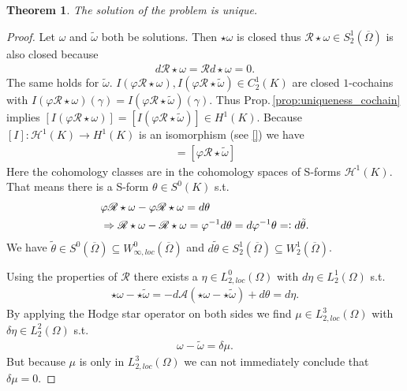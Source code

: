 \documentclass[12pt,a4paper]{article}
\numberwithin{equation}{subsection}
\numberwithin{lemma}{subsection}
\newtheorem{theorem}[lemma]{Theorem}
\theoremstyle{definition}
\newcommand{\aop}{\mathscr{A}}
\newcommand{\omegabar}{\overline{\Omega}}
\newcommand{\rop}{\mathscr{R}} %
\begin{document}
\begin{theorem}
    The solution of the problem is unique.
\end{theorem}
\begin{proof}
    Let $\omega$ and $\tilde{\omega}$ both be solutions. Then $\star\omega$ is 
    closed thus $\rop \star\omega \in S_2^1(\omegabar)$ is also closed because 
    \begin{align*}
        d \rop \star \omega = \rop d\star\omega = 0.
    \end{align*}
    The same 
    holds for $\tilde{\omega}$. 
    $I(\varphi \rop \star \omega)
    , I(\varphi \rop \star \tilde{\omega}) \in C^1_2(K)$ 
    are closed $1$-cochains with
    $I(\varphi\rop \star \omega)(\gamma) 
    = I(\varphi\rop \star \tilde{\omega})(\gamma)$. 
    Thus Prop.\,\ref{prop:uniqueness_cochain} implies 
    $[I(\varphi\rop \star \omega)] 
    = [I(\varphi\rop \star \tilde{\omega})] \in H^1(K)$.
    Because $[I]: \mathscr{H}^1(K) \rightarrow H^1(K)$ is an isomorphism
    (see \ref{}) we have 
    \begin{align*}
        [\varphi\rop \star \omega] = [\varphi\rop \star \tilde{\omega}] 
    \end{align*}
    Here the cohomology classes are in the cohomology spaces of S-forms 
    $\mathscr{H}^1(K)$. That means there is a S-form $\theta \in S^0(K)$ s.t.
    \begin{align*}
        &\varphi \rop \star\omega - \varphi \rop \star\omega = d\theta \\ 
        &\Rightarrow \rop \star\omega -  \rop \star\omega = \varphi^{-1} d\theta 
        = d\varphi^{-1}\theta =\vcentcolon d\tilde{\theta}.
    \end{align*}
    We have $\tilde{\theta} \in S^0(\omegabar) \subseteq 
    W_{\infty,loc}^0(\omegabar)$ and $d \tilde{\theta} \in S_2^1(\omegabar)
    \subseteq W_2^1(\omegabar)$.

    Using the 
    properties of $\rop$ there exists a $\eta \in L_{2,loc}^0(\Omega)$
    with $d\eta \in L^1_2(\Omega)$ s.t. 
    \begin{align*}
        \star\omega - \star\tilde{\omega} 
        = -d\aop(\star\omega - \star\tilde{\omega})
        + d \theta = d\eta.
    \end{align*}
    By applying the Hodge star operator on both sides we find 
    $\mu \in L_{2,loc}^3(\Omega)$ with $\delta \eta \in L^2_2(\Omega)$ s.t.
    \begin{align}
        \omega - \tilde{\omega} = \delta \mu. \label{difference_solutions}
    \end{align}
    But because $\mu$ is only in $L_{2,loc}^3(\Omega)$ 
    we can not immediately conclude that $\delta \mu = 0$.


\end{proof}
\end{document}
